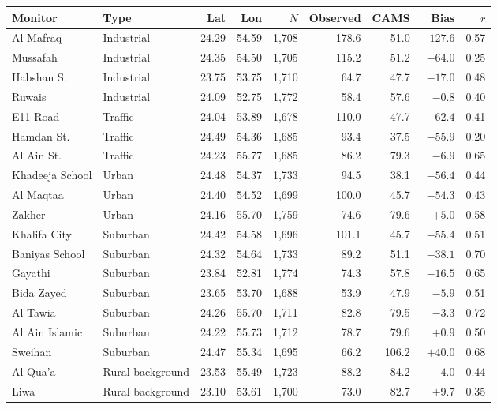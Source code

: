 \begin{tabular}{llrrrrrrr}\toprule
Monitor & Type & Lat & Lon & $N$ & Observed & CAMS & Bias & $r$ \\ \midrule
Al Mafraq & Industrial & 24.29 & 54.59 & 1{,}708 & 178.6 & 51.0 & $-127.6$ & 0.57 \\
Mussafah & Industrial & 24.35 & 54.50 & 1{,}705 & 115.2 & 51.2 & $-64.0$ & 0.25 \\
Habshan S. & Industrial & 23.75 & 53.75 & 1{,}710 & 64.7 & 47.7 & $-17.0$ & 0.48 \\
Ruwais & Industrial & 24.09 & 52.75 & 1{,}772 & 58.4 & 57.6 & $-0.8$ & 0.40 \\
E11 Road & Traffic & 24.04 & 53.89 & 1{,}678 & 110.0 & 47.7 & $-62.4$ & 0.41 \\
Hamdan St. & Traffic & 24.49 & 54.36 & 1{,}685 & 93.4 & 37.5 & $-55.9$ & 0.20 \\
Al Ain St. & Traffic & 24.23 & 55.77 & 1{,}685 & 86.2 & 79.3 & $-6.9$ & 0.65 \\
Khadeeja School & Urban & 24.48 & 54.37 & 1{,}733 & 94.5 & 38.1 & $-56.4$ & 0.44 \\
Al Maqtaa & Urban & 24.40 & 54.52 & 1{,}699 & 100.0 & 45.7 & $-54.3$ & 0.43 \\
Zakher & Urban & 24.16 & 55.70 & 1{,}759 & 74.6 & 79.6 & $+5.0$ & 0.58 \\
Khalifa City & Suburban & 24.42 & 54.58 & 1{,}696 & 101.1 & 45.7 & $-55.4$ & 0.51 \\
Baniyas School & Suburban & 24.32 & 54.64 & 1{,}733 & 89.2 & 51.1 & $-38.1$ & 0.70 \\
Gayathi & Suburban & 23.84 & 52.81 & 1{,}774 & 74.3 & 57.8 & $-16.5$ & 0.65 \\
Bida Zayed & Suburban & 23.65 & 53.70 & 1{,}688 & 53.9 & 47.9 & $-5.9$ & 0.51 \\
Al Tawia & Suburban & 24.26 & 55.70 & 1{,}711 & 82.8 & 79.5 & $-3.3$ & 0.72 \\
Al Ain Islamic & Suburban & 24.22 & 55.73 & 1{,}712 & 78.7 & 79.6 & $+0.9$ & 0.50 \\
Sweihan & Suburban & 24.47 & 55.34 & 1{,}695 & 66.2 & 106.2 & $+40.0$ & 0.68 \\
Al Qua'a & Rural background & 23.53 & 55.49 & 1{,}723 & 88.2 & 84.2 & $-4.0$ & 0.44 \\
Liwa & Rural background & 23.10 & 53.61 & 1{,}700 & 73.0 & 82.7 & $+9.7$ & 0.35 \\
\bottomrule\end{tabular}
